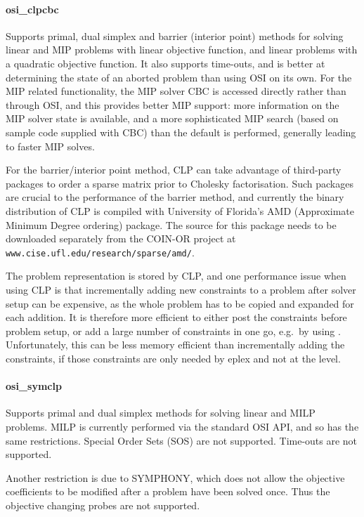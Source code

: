 \paragraph{osi_clpcbc} Supports primal, dual simplex and barrier (interior
point) methods for
solving linear and MIP problems with linear objective function, and linear
problems with a quadratic objective function. It also supports time-outs, and is better 
at determining the state of an aborted problem than using OSI on its own.
For the MIP related functionality, the MIP solver CBC is accessed directly
rather than through OSI, and this 
provides better MIP support: more information on the MIP
solver state is available, and a more sophisticated MIP search (based on
sample code supplied with CBC) than the default is performed, generally
leading to faster MIP solves.

For the barrier/interior point method, CLP can take advantage of
third-party packages to order a sparse matrix prior to Cholesky
factorisation. Such packages are crucial to the performance of the
barrier method, and currently the binary distribution of CLP is compiled
with University of Florida's AMD (Approximate Minimum Degree ordering) 
package. The source for this package needs to be downloaded separately from
the COIN-OR project at {\tt www.cise.ufl.edu/research/sparse/amd/}. 

The problem representation is stored by CLP, and one performance issue 
when using CLP is that incrementally adding new constraints to
a problem after solver setup can be expensive, as the whole problem has to
be copied and expanded for each addition. It is therefore more efficient to 
either post the constraints before problem setup, or add a large number of
constraints in one go, e.g.\ by using 
.
Unfortunately, this can be less memory efficient than incrementally adding
the constraints, if those constraints are only needed by eplex and not at
the {\eclipse} level.

\paragraph{osi_symclp} Supports primal and dual simplex methods for
solving linear and MILP problems. MILP is currently performed via the 
standard OSI API, and so has the same restrictions. Special Order Sets
(SOS) are not supported. Time-outs are not supported.
 
Another restriction is due to SYMPHONY, which does not allow the objective
coefficients to be modified after a problem have been solved once. Thus the
objective changing probes are not supported.

